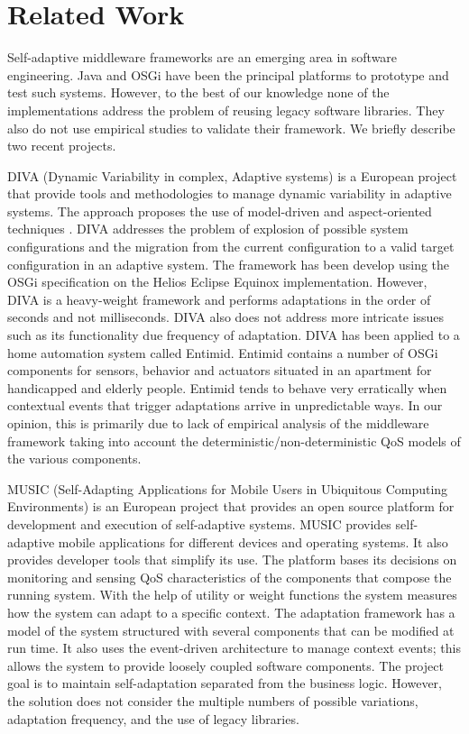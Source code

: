 \section{Related Work}
\label{sec:relatedwork}

Self-adaptive middleware frameworks are an emerging area in software engineering. Java and OSGi have been the principal platforms to prototype and test such systems. However, to the best of our knowledge none of the implementations address the problem of reusing legacy software libraries. They also do not use empirical studies to validate their framework. We briefly describe two recent projects.

DIVA (Dynamic Variability in complex, Adaptive systems) is a European project that provide tools and methodologies to manage dynamic variability in adaptive systems. The approach proposes the use of model-driven and aspect-oriented techniques \cite{Romero2010}. DIVA addresses the problem of explosion of possible system configurations and the migration from the current configuration to a valid target configuration \cite{Morin2009} in an adaptive system.  The framework has been develop using the OSGi specification on the Helios Eclipse Equinox implementation. However, DIVA is a heavy-weight framework and performs adaptations in the order of seconds and not milliseconds. DIVA also does not address more intricate issues such as its functionality due  frequency of adaptation. DIVA has been applied to a home automation system called Entimid. Entimid contains a number of OSGi components for sensors, behavior and actuators situated in an apartment for handicapped and elderly people. Entimid tends to behave very erratically when contextual events that trigger adaptations arrive in unpredictable ways. In our opinion, this is primarily due to lack of empirical analysis of the middleware framework taking into account the deterministic/non-deterministic QoS models of the various components.

MUSIC (Self-Adapting Applications for Mobile Users in Ubiquitous Computing Environments)  is an European project  that provides an open source platform for development and execution of self-adaptive systems. MUSIC provides self-adaptive mobile applications for different devices and operating systems. It also provides developer tools that simplify its use. The platform bases its decisions on monitoring and sensing QoS characteristics of the components that compose the running system. With the help of utility or weight functions the system measures how the system can adapt to a specific context. The adaptation framework has a model of the system structured with several components that can be modified at run time. It also uses the event-driven architecture to manage context events; this allows the system to provide loosely coupled software components. The project goal is to maintain self-adaptation separated from the business logic. However, the solution does not consider the multiple numbers of possible variations, adaptation frequency, and the use of legacy libraries.
